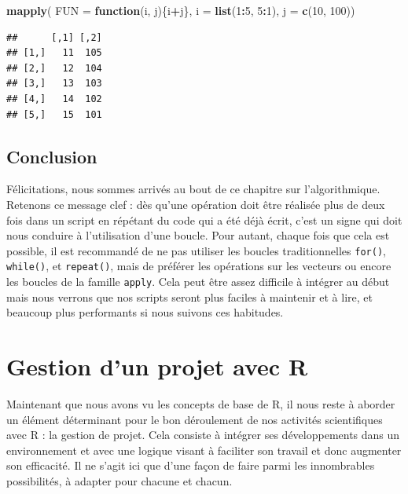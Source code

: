 \documentclass[
]{book}
\newenvironment{Shaded}{\begin{snugshade}}{\end{snugshade}}
\newcommand{\ControlFlowTok}[1]{\textcolor[rgb]{0.13,0.29,0.53}{\textbf{#1}}}
\newcommand{\DataTypeTok}[1]{\textcolor[rgb]{0.13,0.29,0.53}{#1}}
\newcommand{\DecValTok}[1]{\textcolor[rgb]{0.00,0.00,0.81}{#1}}
\newcommand{\KeywordTok}[1]{\textcolor[rgb]{0.13,0.29,0.53}{\textbf{#1}}}
\newcommand{\NormalTok}[1]{#1}
\newcommand{\OperatorTok}[1]{\textcolor[rgb]{0.81,0.36,0.00}{\textbf{#1}}}
\begin{document}
\begin{Shaded}
\begin{Highlighting}[]
\KeywordTok{mapply}\NormalTok{(}
  \DataTypeTok{FUN =} \ControlFlowTok{function}\NormalTok{(i, j)\{i}\OperatorTok{+}\NormalTok{j\}, }
  \DataTypeTok{i =} \KeywordTok{list}\NormalTok{(}\DecValTok{1}\OperatorTok{:}\DecValTok{5}\NormalTok{, }\DecValTok{5}\OperatorTok{:}\DecValTok{1}\NormalTok{), }
  \DataTypeTok{j =} \KeywordTok{c}\NormalTok{(}\DecValTok{10}\NormalTok{, }\DecValTok{100}\NormalTok{))}
\end{Highlighting}
\end{Shaded}

\begin{verbatim}
##      [,1] [,2]
## [1,]   11  105
## [2,]   12  104
## [3,]   13  103
## [4,]   14  102
## [5,]   15  101
\end{verbatim}

\hypertarget{conclusion-6}{%
\section{Conclusion}\label{conclusion-6}}

Félicitations, nous sommes arrivés au bout de ce chapitre sur l'algorithmique. Retenons ce message clef : dès qu'une opération doit être réalisée plus de deux fois dans un script en répétant du code qui a été déjà écrit, c'est un signe qui doit nous conduire à l'utilisation d'une boucle. Pour autant, chaque fois que cela est possible, il est recommandé de ne pas utiliser les boucles traditionnelles \texttt{for()}, \texttt{while()}, et \texttt{repeat()}, mais de préférer les opérations sur les vecteurs ou encore les boucles de la famille \texttt{apply}. Cela peut être assez difficile à intégrer au début mais nous verrons que nos scripts seront plus faciles à maintenir et à lire, et beaucoup plus performants si nous suivons ces habitudes.

\hypertarget{project}{%
\chapter{Gestion d'un projet avec R}\label{project}}

Maintenant que nous avons vu les concepts de base de R, il nous reste à aborder un élément déterminant pour le bon déroulement de nos activités scientifiques avec R : la gestion de projet. Cela consiste à intégrer ses développements dans un environnement et avec une logique visant à faciliter son travail et donc augmenter son efficacité. Il ne s'agit ici que d'une façon de faire parmi les innombrables possibilités, à adapter pour chacune et chacun.
\end{document}

